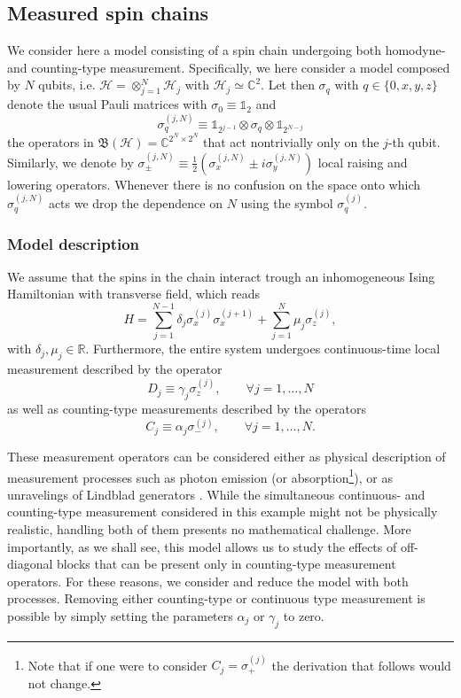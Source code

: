 \documentclass[aihp,12pt]{imsart}
\newcommand{\Hc}{\mathcal{H}}
\newcommand{\Rb}{\mathbb{R}}
\newcommand{\Cb}{\mathbb{C}}
\newcommand{\Bf}{\mathfrak{B}}
\newcommand{\one}{\mathbb{1}}
\theoremstyle{theorem}
\theoremstyle{definition}
\theoremstyle{remark}
\begin{document}
\subsection{Measured spin chains}
\label{sec:measured_spin_chains}
We  consider here a model consisting of a spin chain undergoing both homodyne- and counting-type measurement. 
Specifically, we here consider a model composed by $N$ qubits, i.e. $\Hc= \otimes_{j=1}^N \Hc_j$ with $\Hc_j \simeq \Cb^2$. Let then $\sigma_q$ with $q\in\{0,x,y,z\}$ denote the usual Pauli matrices with $\sigma_0\equiv\one_2$ and \[\sigma_q^{(j,N)} \equiv \one_{2^{j-1}} \otimes \sigma_q \otimes \one_{2^{N-j}}\] the operators in $\Bf(\Hc) = \Cb^{2^{N}\times 2^N}$ that act nontrivially only on the $j$-th qubit. Similarly, we denote by $\sigma_\pm^{(j,N)}\equiv \frac{1}{2}\left(\sigma_x^{(j,N)}\pm i\sigma_y^{(j,N)}\right)$ local raising and lowering operators. Whenever there is no confusion on the space onto which $\sigma_q^{(j,N)}$ acts we drop the dependence on $N$ using the symbol $\sigma_q^{(j)}$. 

\subsubsection{Model description}
We assume that the spins in the chain interact trough an inhomogeneous Ising Hamiltonian with transverse field, which reads 
\begin{equation}
    H = \sum_{j=1}^{N-1} \delta_j \sigma_x^{(j)}\sigma_x^{(j+1)} + \sum_{j=1}^N \mu_j \sigma_z^{(j)},
\end{equation}
with $\delta_j,\mu_j\in\Rb$.
Furthermore, the entire system undergoes continuous-time local measurement described by the operator
\[ D_j \equiv \gamma_j \sigma_z^{(j)}, \qquad \forall j = 1,\dots, N\]
as well as counting-type measurements described by the operators
\[ C_j \equiv \alpha_j \sigma_-^{(j)}, \qquad \forall j=1,\dots,N.\]

These measurement operators can be considered either as physical description of measurement processes such as photon emission (or absorption\footnote{Note that if one were to consider $C_j=\sigma_+^{(j)}$ the derivation that follows would not change.}), or as unravelings of Lindblad generators \cite{PhysRevB.105.064305,turkeshi_measurement-induced_2021}. 
While the simultaneous continuous- and counting-type measurement considered in this example might not be physically realistic, handling both of them presents no mathematical challenge.
More importantly, as we shall see, this model allows us to study the effects of off-diagonal blocks that can be present only in counting-type measurement operators. For these reasons, we consider and reduce the model with both processes. Removing either counting-type or continuous type measurement is possible by simply setting the parameters $\alpha_j$ or $\gamma_j$ to zero. 
\end{document}
